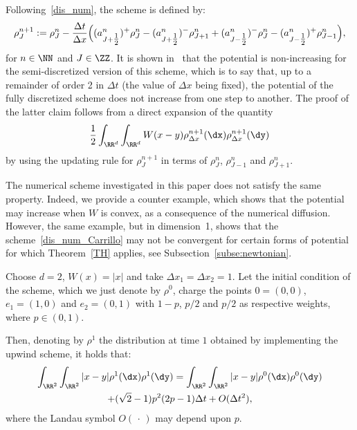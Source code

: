 Following~\eqref{dis_num}, the scheme is defined by:
\begin{equation}\label{dis_num_Carrillo}
\rho^{n+1}_{J} := \rho^n_{J} - \frac{\Delta t}{\Delta x}
\Bigl((a^n_{J+\tfrac12} )^{+} \rho_{J}^n -
(a^n_{J+\tfrac12} )^{-} \rho_{J+1}^n +
(a^n_{J-\tfrac12} )^{-} \rho_{J}^n -
(a^n_{J-\tfrac12} )^{+} \rho_{J-1}^n
\Bigr),
\end{equation}
for $n \in \NN$ and $J \in \ZZ$. It is shown in~\cite{CCH} that the potential is non-increasing for the semi-discretized version of this scheme, which is to say that, up to a remainder of order 2 in $\Delta t$ (the value of $\Delta x$ being fixed), the potential of the fully discretized scheme does not increase from one step to another. The proof of the latter claim follows from a direct expansion of the quantity
\begin{equation*}
\frac12
\int_{\RR^d}
\int_{\RR^d} W(x-y)
\rho_{\Delta x}^{n+1}(\dx)
\rho_{\Delta x}^{n+1}(\dy)
\end{equation*}
by using the updating rule for $\rho^{n+1}_{J}$ in terms of $\rho^{n}_{J}$, $\rho^{n}_{J-1}$ and $\rho^{n}_{J+1}$.

The numerical scheme investigated in this paper does not satisfy the same property. Indeed, we provide a counter example, which shows that the potential may increase when $W$ is convex, as a consequence of the numerical diffusion. However, the same example, but in dimension~1, shows that the scheme~\eqref{dis_num_Carrillo} may not be convergent for certain forms of potential for which Theorem~\ref{TH} applies, see Subsection~\ref{subse:newtonian}.

\begin{prop}
Choose $d=2$, $W(x)= | x |$ and take $\Delta x_{1} = \Delta x_{2} = 1$. Let the initial condition of the scheme, which we just denote by $\rho^0$, charge the points $0=(0,0)$, $e_{1}=(1,0)$ and $e_{2}=(0,1)$ with $1-p$, $p/2$ and $p/2$ as respective weights, where $p \in (0,1)$.

Then, denoting by $\rho^1$ the distribution at time $1$ obtained by implementing the upwind scheme, it holds that:
\begin{multline}\label{eq:counterexample}
\int_{\RR^2}\int_{\RR^2} \vert x- y \vert\rho^1(\dx)\rho^1(\dy) =  \int_{\RR^2}\int_{\RR^2} \vert x- y \vert\rho^0(\dx)\rho^0(\dy) \\
+ (\sqrt{2} -1 ) p^2 (2p-1) \Delta t + O(\Delta t^2),
\end{multline}
where the Landau symbol $O({\,\cdot\,})$ may depend upon $p$.
\end{prop}

